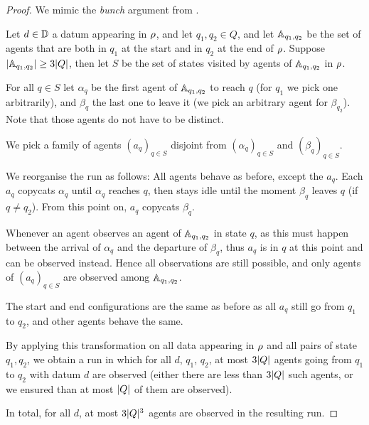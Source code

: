 \documentclass[a4paper,UKenglish,cleveref, autoref, thm-restate]{lipics-v2021}
\newcommand{\corto}[1]{\todo[color=blue!20]{\small #1}}
\begin{document}
	\begin{proof}
		We mimic the \emph{bunch} argument from \corto{ref}. 
		
		Let $d\in \mathbb{D}$ a datum appearing in $\rho$, and let $q_1, q_2 \in Q$, and let $\mathbb{A}_{q_1, q_2}$ be the set of agents that are both in $q_1$ at the start and in $q_2$ at the end of $\rho$. Suppose $|\mathbb{A}_{q_1, q_2}| \geq 3|Q|$, then let $S$ be the set of states visited by agents of $\mathbb{A}_{q_1, q_2}$ in $\rho$.
		
		For all $q \in S$ let $\alpha_q$ be the first agent of $\mathbb{A}_{q_1, q_2}$ to reach $q$ (for $q_1$ we pick one arbitrarily), and $\beta_q$ the last one to leave it (we pick an arbitrary agent for $\beta_{q_2}$). 
		Note that those agents do not have to be distinct.
		  
		We pick a family of agents $(a_q)_{q \in S}$ disjoint from $(\alpha_q)_{q \in S}$ and $(\beta_q)_{q \in S}$.
		
		We reorganise the run as follows: All agents behave as before, except the $a_q$. Each $a_q$ copycats $\alpha_q$ until $\alpha_q$ reaches $q$, then stays idle until the moment $\beta_q$ leaves $q$ (if $q \neq q_2$). From this point on, $a_q$ copycats $\beta_q$.
		
		Whenever an agent observes an agent of $\mathbb{A}_{q_1, q_2}$ in state $q$, as this must happen between the arrival of $\alpha_q$ and the departure of $\beta_q$, thus $a_q$ is in $q$ at this point and can be observed instead. Hence all observations are still possible, and only agents of $(a_{q})_{q\in S}$ are observed among $\mathbb{A}_{q_1, q_2}$.
		
		The start and end configurations are the same as before as all $a_q$ still go from $q_1$ to $q_2$, and other agents behave the same.
		
		By applying this transformation on all data appearing in $\rho$ and all pairs of state $q_1, q_2$, we obtain a run in which for all $d$, $q_1$, $q_2$, at most $3|Q|$ agents going from $q_1$ to $q_2$ with datum $d$ are observed (either there are less than $3|Q|$ such agents, or we ensured than at most $|Q|$ of them are observed).
		
		In total, for all $d$, at most $3|Q|^3$ agents are observed in the resulting run.
 	\end{proof}
\end{document}

